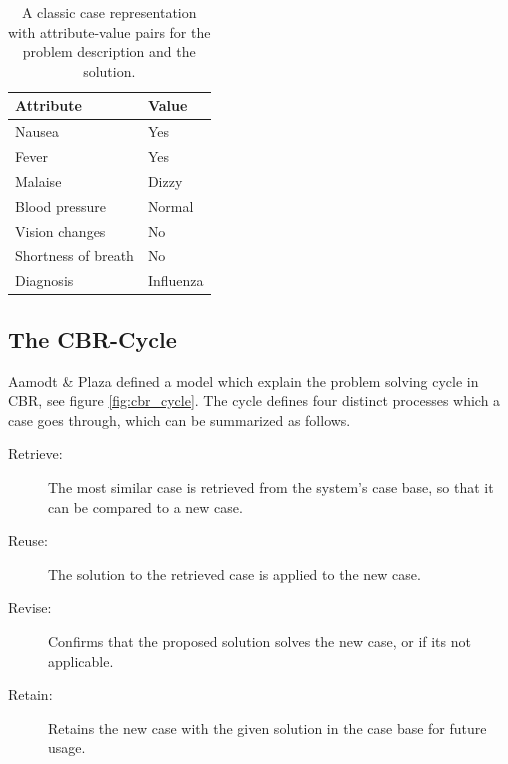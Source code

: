 \begin{table}[H]
\centering
\small
\caption{A classic case representation with attribute-value pairs for the problem description and the solution.}
\label{tab:example_case}
\begin{tabulary}{\textwidth}{|L|L|}
\hline

\textbf{Attribute}           & \textbf{Value}     \\ \hline
Nausea              & Yes       \\ \hline
Fever               & Yes       \\ \hline
Malaise             & Dizzy     \\ \hline
Blood pressure      & Normal    \\ \hline
Vision changes      & No        \\ \hline
Shortness of breath & No        \\ \hline
Diagnosis           & Influenza \\ \hline
\end{tabulary}
\end{table}

\subsection{The CBR-Cycle}\label{sec:cbr-cycle}

Aamodt \& Plaza\cite{aamodt1994case} defined a model which explain the problem solving cycle in CBR, see figure \ref{fig:cbr_cycle}. The cycle defines four distinct processes which a case goes through, which can be summarized as follows.

\begin{description}
\item [Retrieve:] The most similar case is retrieved from the system's case base, so that it can be compared to a new case.
\item [Reuse:] The solution to the retrieved case is applied to the new case.
\item [Revise:] Confirms that the proposed solution solves the new case, or if its not applicable.
\item [Retain:] Retains the new case with the given solution in the case base for future usage.
\end{description}

